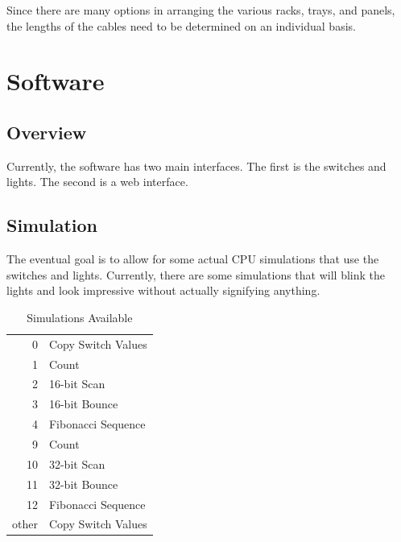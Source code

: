 \documentclass[10pt, openany]{book}
\begin{document}
Since there are many options in arranging the various racks, trays, and panels, the lengths of the cables need to be determined on an individual basis.

\chapter{Software}
\section{Overview}
Currently, the software has two main interfaces.  The first is the switches and lights.  The second is a web interface.

\section{Simulation}
The eventual goal is to allow for some actual CPU simulations that use the switches and lights.  Currently, there are some simulations that will blink the lights and look impressive without actually signifying anything.

\begin{table}
  \caption{Simulations Available}
  \label{tbl:Simulations}
  \centering
  \begin{tabular}{|r|l|}
    \hline
    0 & Copy Switch Values\\
    1 & Count\\
    2 & 16-bit Scan\\
    3 & 16-bit Bounce\\
    4 & Fibonacci Sequence\\
    9 & Count\\
    10 & 32-bit Scan\\
    11 & 32-bit Bounce\\
    12 & Fibonacci Sequence\\
    \hline
    other & Copy Switch Values\\
    \hline
  \end{tabular}
\end{table}
\end{document}
